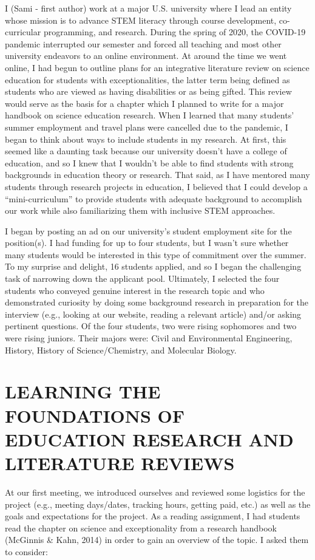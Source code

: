 \documentclass[11.5pt]{sig-alternate}
\begin{document}
\begin{large}
I (Sami - first author) work at a major U.S. university where I lead an entity whose mission is to advance STEM literacy through course development, co-curricular programming, and research. During the spring of 2020, the COVID-19 pandemic interrupted our semester and forced all teaching and most other university endeavors to an online environment.  At around the time we went online, I had begun to outline plans for an integrative literature review on science education for students with exceptionalities, the latter term being defined as students who are viewed as having disabilities or as being gifted. This review would serve as the basis for a chapter which I planned to write for a major handbook on science education research. When I learned that many students’ summer employment and travel plans were cancelled due to the pandemic, I began to think about ways to include students in my research.  At first, this seemed like a daunting task because our university doesn’t have a college of education, and so I knew that I wouldn’t be able to find students with strong backgrounds in education theory or research.  That said, as I have mentored many students through research projects in education, I believed that I could develop a “mini-curriculum” to provide students with adequate background to accomplish our work while also familiarizing them with inclusive STEM approaches.  

I began by posting an ad on our university’s student employment site for the position(s).  I had funding for up to four students, but I wasn’t sure whether many students would be interested in this type of commitment over the summer.  To my surprise and delight, 16 students applied, and so I began the challenging task of narrowing down the applicant pool.  Ultimately, I selected the four students who conveyed genuine interest in the research topic and who demonstrated curiosity by doing some background research in preparation for the interview (e.g., looking at our website, reading a relevant article) and/or asking pertinent questions.  Of the four students, two were rising sophomores and two were rising juniors. Their majors were: Civil and Environmental Engineering, History, History of Science/Chemistry, and Molecular Biology.

\section*{LEARNING THE FOUNDATIONS OF EDUCATION RESEARCH AND LITERATURE REVIEWS}

At our first meeting, we introduced ourselves and reviewed some logistics for the project (e.g., meeting days/dates, tracking hours, getting paid, etc.) as well as the goals and expectations for the project. As a reading assignment, I had students read the chapter on science and exceptionality from a research handbook (McGinnis \& Kahn, 2014) in order to gain an overview of the topic.  I asked them to consider: 


\end{large}
\end{document}
